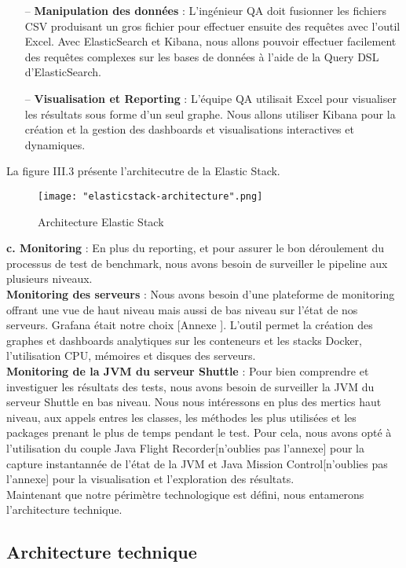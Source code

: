 \begin{spacing}{1.2}
\begin{itemize}
    \item[--] \textbf{Manipulation des données} : L'ingénieur QA doit fusionner les fichiers CSV produisant un gros fichier pour effectuer ensuite des requêtes avec l'outil Excel. Avec ElasticSearch et Kibana, nous allons pouvoir effectuer facilement des requêtes complexes sur les bases de données à l'aide de la Query DSL d'ElasticSearch.
    \item[--] \textbf{Visualisation et Reporting} :  L'équipe QA utilisait Excel pour visualiser les résultats sous forme d'un seul graphe. Nous allons utiliser Kibana pour la création et la gestion des dashboards et visualisations interactives et dynamiques.
\end{itemize}
La figure III.3 présente l'architecutre de la Elastic Stack.
\begin{figure}[!ht]\centering
\texttt{[image: "elasticstack-architecture".png]}
\caption{Architecture Elastic Stack}
\label{fig:fig2}
\end{figure}
\FloatBarrier
\textbf{c. Monitoring} : 
En plus du reporting, et pour assurer le bon déroulement du processus de test de benchmark, nous avons besoin    de surveiller le pipeline aux plusieurs niveaux.\\
\textbf{Monitoring des serveurs} : Nous avons besoin d'une plateforme de monitoring offrant une vue de haut niveau mais aussi de bas niveau sur l'état de nos serveurs. Grafana était notre choix [Annexe ]. L'outil permet la création des graphes et dashboards analytiques sur les conteneurs et les stacks Docker, l'utilisation CPU, mémoires et disques des serveurs.\\
\textbf{Monitoring de la JVM du serveur Shuttle} : Pour bien comprendre et investiguer les résultats des tests, nous avons besoin de surveiller la JVM du serveur Shuttle en bas niveau. Nous nous intéressons en plus des mertics haut niveau, aux appels entres les classes, les méthodes les plus utilisées et les packages prenant le plus de temps pendant le test. Pour cela, nous avons opté à l'utilisation du couple Java Flight Recorder[n'oublies pas l'annexe] pour la capture instantannée de l'état de la JVM et Java Mission Control[n'oublies pas l'annexe] pour la visualisation et l'exploration des résultats. \\
Maintenant que notre périmètre technologique est défini, nous entamerons l'architecture technique.
\subsection{Architecture technique}

\end{spacing}
